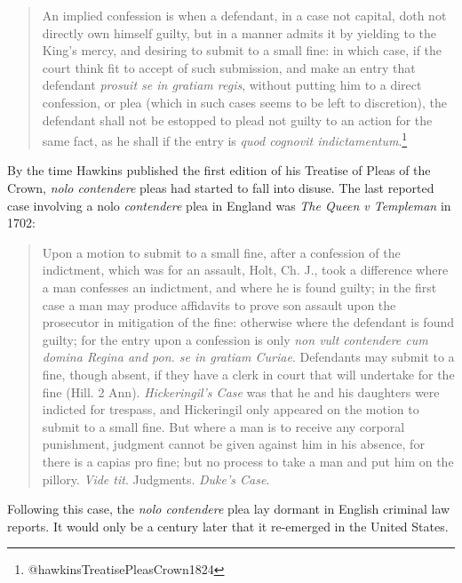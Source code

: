\begin{quote}
\singlespacing
An implied confession is when a defendant, in a case not capital, doth not directly own himself guilty, but in a manner admits it by yielding to the King's mercy, and desiring to submit to a small fine: in which case, if the court think fit to accept of such submission, and make an entry that defendant \textit{prosuit se in gratiam regis}, without putting him to a direct confession, or plea (which in such cases seems to be left to discretion), the defendant shall not be estopped to plead not guilty to an action for the same fact, as he shall if the entry is \textit{quod cognovit indictamentum}.\footnote{@hawkinsTreatisePleasCrown1824}
\end{quote}

By the time Hawkins published the first edition of his Treatise of Pleas of the Crown, \textit{nolo contendere} pleas had started to fall into disuse. The last reported case involving a nolo\textit{ contendere} plea in England was \textit{The Queen v Templeman} in 1702:

\begin{quote}
\singlespacing
Upon a motion to submit to a small fine, after a confession of the indictment, which was for an assault, Holt, Ch. J., took a difference where a man confesses an indictment, and where he is found guilty; in the first case a man may produce affidavits to prove son assault upon the prosecutor in mitigation of the fine: otherwise where the defendant is found guilty; for the entry upon a confession is only \textit{non vult contendere cum domina Regina and pon. se in gratiam Curiae}. Defendants may submit to a fine, though absent, if they have a clerk in court that will undertake for the fine (Hill. 2 Ann). \textit{Hickeringil's Case} was that he and his daughters were indicted for trespass, and Hickeringil only appeared on the motion to submit to a small fine. But where a man is to receive any corporal punishment, judgment cannot be given against him in his absence, for there is a capias pro fine; but no process to take a man and put him on the pillory. \textit{Vide tit}. Judgments. \textit{Duke's Case}.
\end{quote}

Following this case, the \textit{nolo contendere} plea lay dormant in English criminal law reports. It would only be a century later that it re-emerged in the United States.

